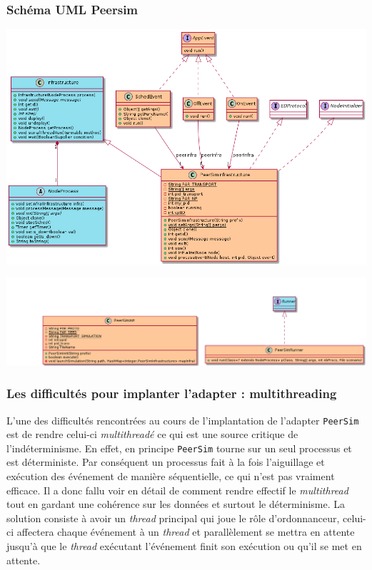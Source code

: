 \documentclass{article}
\begin{document}
							\subsubsection{Schéma UML Peersim}
							\hspace*{-1.3cm} \includegraphics[width=17cm]{uml/peersim1.png}
		
							\hspace*{-3.2cm} \includegraphics[width=20cm]{uml/peersim2.png}
		
						\subsubsection{Les difficultés pour implanter l'adapter : multithreading}
						L’une des difficultés rencontrées au cours de l’implantation de l’adapter \verb|PeerSim| est de rendre celui-ci \emph{multithreadé} ce qui est une source critique de l'indéterminisme.
						En effet, en principe \verb|PeerSim| tourne sur un seul processus et est déterministe. Par conséquent un processus fait à la fois l’aiguillage et exécution des événement de manière séquentielle, ce qui n’est pas vraiment efficace. Il a donc fallu voir en détail de comment rendre effectif le \emph{multithread} tout en gardant une cohérence sur les données et surtout le déterminisme.  
						La solution consiste à avoir un \emph{thread} principal qui joue le rôle d’ordonnanceur, celui-ci affectera chaque événement à un \emph{thread} et parallèlement se mettra en attente jusqu’à que le \emph{thread} exécutant l’événement finit son exécution ou qu’il se met en attente.
\end{document}
